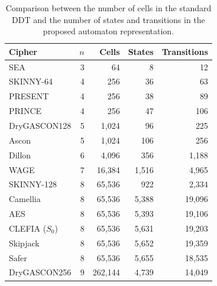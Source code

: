 \begin{table}
\caption{Comparison between the number of cells in the standard DDT and the number of states and transitions in the proposed automaton representation.}
    \label{tab:compression_results}

    \centering
    \setlength{\tabcolsep}{6pt}

    \begin{tabular}{lrrrr}
        \hline
        
        \textbf{Cipher} & $n$ & \textbf{Cells} & \textbf{States} & \textbf{Transitions} \\
        
        \hline

        SEA & 3 & 64 & 8 & 12 \\
        SKINNY-64 & 4 & 256 & 36 & 63 \\
        PRESENT & 4 & 256 & 38 & 89 \\
        PRINCE & 4 & 256 & 47 & 106 \\
        DryGASCON128 & 5 & 1,024 & 96 & 225 \\
        Ascon & 5 & 1,024 & 106 & 256 \\
        Dillon & 6 & 4,096 & 356 & 1,188 \\
        WAGE & 7 & 16,384 & 1,516 & 4,965 \\
        SKINNY-128 & 8 & 65,536 & 922 & 2,334 \\
        Camellia & 8 & 65,536 & 5,388 & 19,096 \\
        AES & 8 & 65,536 & 5,393 & 19,106 \\
        CLEFIA ($S_{0}$) & 8 & 65,536 & 5,631 & 19,203 \\
        Skipjack & 8 & 65,536 & 5,652 & 19,359 \\
        Safer & 8 & 65,536 & 5,655 & 18,535 \\
        DryGASCON256 & 9 & 262,144 & 4,739 & 14,049 \\
        
        \hline
    \end{tabular}
\end{table}

